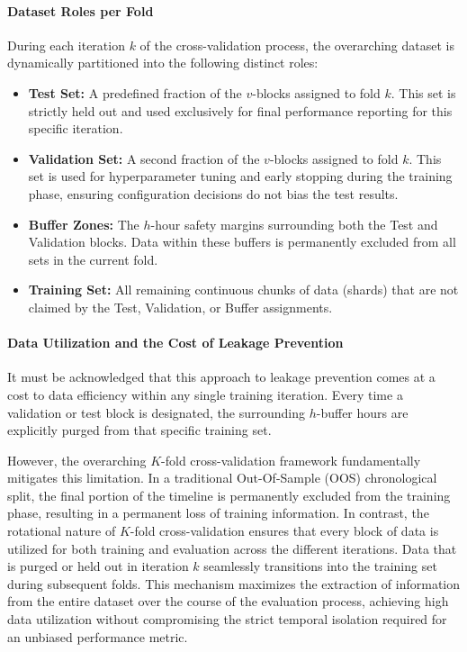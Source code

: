 \paragraph{Dataset Roles per Fold}
During each iteration $k$ of the cross-validation process, the overarching dataset is dynamically partitioned into the following distinct roles:
\begin{itemize}
    \item \textbf{Test Set:} A predefined fraction of the $v$-blocks assigned to fold $k$. This set is strictly held out and used exclusively for final performance reporting for this specific iteration.
    \item \textbf{Validation Set:} A second fraction of the $v$-blocks assigned to fold $k$. This set is used for hyperparameter tuning and early stopping during the training phase, ensuring configuration decisions do not bias the test results.
    \item \textbf{Buffer Zones:} The $h$-hour safety margins surrounding both the Test and Validation blocks. Data within these buffers is permanently excluded from all sets in the current fold.
    \item \textbf{Training Set:} All remaining continuous chunks of data (shards) that are not claimed by the Test, Validation, or Buffer assignments.
\end{itemize}

\paragraph{Data Utilization and the Cost of Leakage Prevention}
It must be acknowledged that this approach to leakage prevention comes at a cost to data efficiency within any single training iteration. Every time a validation or test block is designated, the surrounding $h$-buffer hours are explicitly purged from that specific training set. 

However, the overarching $K$-fold cross-validation framework fundamentally mitigates this limitation. In a traditional Out-Of-Sample (OOS) chronological split, the final portion of the timeline is permanently excluded from the training phase, resulting in a permanent loss of training information. In contrast, the rotational nature of $K$-fold cross-validation ensures that every block of data is utilized for both training and evaluation across the different iterations. Data that is purged or held out in iteration $k$ seamlessly transitions into the training set during subsequent folds. This mechanism maximizes the extraction of information from the entire dataset over the course of the evaluation process, achieving high data utilization without compromising the strict temporal isolation required for an unbiased performance metric.
